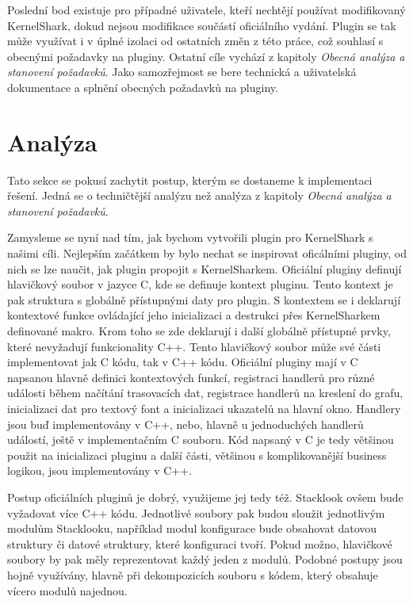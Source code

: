 Poslední bod existuje pro případné uživatele, kteří nechtějí používat modifikovaný KernelShark, dokud nejsou modifikace součástí oficiálního vydání. Plugin se tak může využívat i v úplné izolaci od ostatních změn z této práce, což souhlasí s obecnými požadavky na pluginy. Ostatní cíle vychází z kapitoly \emph{Obecná analýza a stanovení požadavků}. Jako samozřejmost se bere technická a uživatelská dokumentace a splnění obecných požadavků na pluginy.

\section{Analýza}
Tato sekce se pokusí zachytit postup, kterým se dostaneme k implementaci řešení. Jedná se o techničtější analýzu než analýza z kapitoly \emph{Obecná analýza a stanovení požadavků}.

Zamysleme se nyní nad tím, jak bychom vytvořili plugin pro KernelShark s našimi cíli. Nejlepším začátkem by bylo nechat se inspirovat oficálními pluginy, od nich se lze naučit, jak plugin propojit s KernelSharkem. Oficiální pluginy definují hlavičkový soubor v jazyce C, kde se definuje kontext pluginu. Tento kontext je pak struktura s globálně přístupnými daty pro plugin. S kontextem se i deklarují kontextové funkce ovládající jeho inicializaci a destrukci přes KernelSharkem definované makro. Krom toho se zde deklarují i další globálně přístupné prvky, které nevyžadují funkcionality C++. Tento hlavičkový soubor může své části implementovat jak C kódu, tak v C++ kódu. Oficiální pluginy mají v C napsanou hlavně definici kontextových funkcí, registraci handlerů pro různé události během načítání trasovacích dat, registrace handlerů na kreslení do grafu, inicializaci dat pro textový font a inicializaci ukazatelů na hlavní okno. Handlery jsou buď implementovány v C++, nebo, hlavně u jednoduchých handlerů událostí, ještě v implementačním C souboru. Kód napsaný v C je tedy většinou použit na inicializaci pluginu a další části, většinou s komplikovanější business logikou, jsou implementovány v C++.

Postup oficiálních pluginů je dobrý, využijeme jej tedy též. Stacklook ovšem bude vyžadovat více C++ kódu. Jednotlivé soubory pak budou sloužit jednotlivým modulům Stacklooku, například modul konfigurace bude obsahovat datovou struktury či datové struktury, které konfiguraci tvoří. Pokud možno, hlavičkové soubory by pak měly reprezentovat každý jeden z modulů. Podobné postupy jsou hojně využívány, hlavně při dekompozicích souboru s kódem, který obsahuje vícero modulů najednou.

